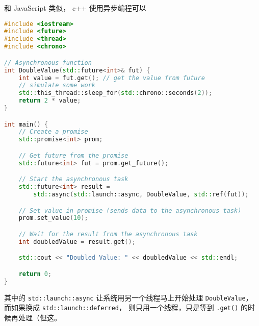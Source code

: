 
和 JavaScript 类似， c++ 使用异步编程可以

\begin{lstlisting}[language=cpp]
#include <iostream>
#include <future>
#include <thread>
#include <chrono>

// Asynchronous function
int DoubleValue(std::future<int>& fut) {
    int value = fut.get(); // get the value from future
    // simulate some work
    std::this_thread::sleep_for(std::chrono::seconds(2));
    return 2 * value;
}

int main() {
    // Create a promise
    std::promise<int> prom;

    // Get future from the promise
    std::future<int> fut = prom.get_future();

    // Start the asynchronous task
    std::future<int> result =
        std::async(std::launch::async, DoubleValue, std::ref(fut));

    // Set value in promise (sends data to the asynchronous task)
    prom.set_value(10);

    // Wait for the result from the asynchronous task
    int doubledValue = result.get();

    std::cout << "Doubled Value: " << doubledValue << std::endl;

    return 0;
}
\end{lstlisting}
其中的 \verb`std::launch::async` 让系统用另一个线程马上开始处理 \verb`DoubleValue`， 而如果换成 \verb`std::launch::deferred`， 则只用一个线程，只是等到 \verb`.get()` 的时候再处理（但这。
